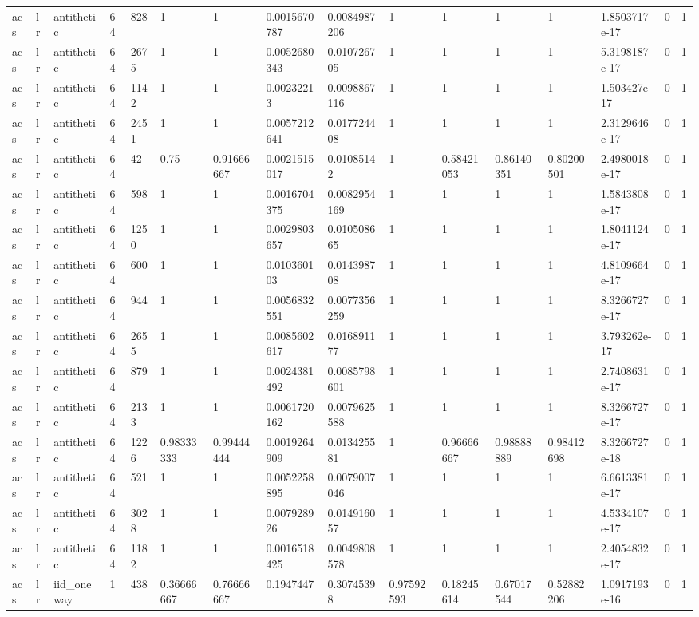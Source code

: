 \begin{tabular}{llllllllllllllll}
acs & lr & antithetic & 64 & 828 & 1 & 1 & 0.0015670787 & 0.0084987206 & 1 & 1 & 1 & 1 & 1.8503717e-17 & 0 & 1 \\
acs & lr & antithetic & 64 & 2675 & 1 & 1 & 0.0052680343 & 0.010726705 & 1 & 1 & 1 & 1 & 5.3198187e-17 & 0 & 1 \\
acs & lr & antithetic & 64 & 1142 & 1 & 1 & 0.00232213 & 0.0098867116 & 1 & 1 & 1 & 1 & 1.503427e-17 & 0 & 1 \\
acs & lr & antithetic & 64 & 2451 & 1 & 1 & 0.0057212641 & 0.017724408 & 1 & 1 & 1 & 1 & 2.3129646e-17 & 0 & 1 \\
acs & lr & antithetic & 64 & 42 & 0.75 & 0.91666667 & 0.0021515017 & 0.01085142 & 1 & 0.58421053 & 0.86140351 & 0.80200501 & 2.4980018e-17 & 0 & 1 \\
acs & lr & antithetic & 64 & 598 & 1 & 1 & 0.0016704375 & 0.0082954169 & 1 & 1 & 1 & 1 & 1.5843808e-17 & 0 & 1 \\
acs & lr & antithetic & 64 & 1250 & 1 & 1 & 0.0029803657 & 0.010508665 & 1 & 1 & 1 & 1 & 1.8041124e-17 & 0 & 1 \\
acs & lr & antithetic & 64 & 600 & 1 & 1 & 0.010360103 & 0.014398708 & 1 & 1 & 1 & 1 & 4.8109664e-17 & 0 & 1 \\
acs & lr & antithetic & 64 & 944 & 1 & 1 & 0.0056832551 & 0.0077356259 & 1 & 1 & 1 & 1 & 8.3266727e-17 & 0 & 1 \\
acs & lr & antithetic & 64 & 2655 & 1 & 1 & 0.0085602617 & 0.016891177 & 1 & 1 & 1 & 1 & 3.793262e-17 & 0 & 1 \\
acs & lr & antithetic & 64 & 879 & 1 & 1 & 0.0024381492 & 0.0085798601 & 1 & 1 & 1 & 1 & 2.7408631e-17 & 0 & 1 \\
acs & lr & antithetic & 64 & 2133 & 1 & 1 & 0.0061720162 & 0.0079625588 & 1 & 1 & 1 & 1 & 8.3266727e-17 & 0 & 1 \\
acs & lr & antithetic & 64 & 1226 & 0.98333333 & 0.99444444 & 0.0019264909 & 0.013425581 & 1 & 0.96666667 & 0.98888889 & 0.98412698 & 8.3266727e-18 & 0 & 1 \\
acs & lr & antithetic & 64 & 521 & 1 & 1 & 0.0052258895 & 0.0079007046 & 1 & 1 & 1 & 1 & 6.6613381e-17 & 0 & 1 \\
acs & lr & antithetic & 64 & 3028 & 1 & 1 & 0.007928926 & 0.014916057 & 1 & 1 & 1 & 1 & 4.5334107e-17 & 0 & 1 \\
acs & lr & antithetic & 64 & 1182 & 1 & 1 & 0.0016518425 & 0.0049808578 & 1 & 1 & 1 & 1 & 2.4054832e-17 & 0 & 1 \\
acs & lr & iid\_oneway & 1 & 438 & 0.36666667 & 0.76666667 & 0.1947447 & 0.30745398 & 0.97592593 & 0.18245614 & 0.67017544 & 0.52882206 & 1.0917193e-16 & 0 & 1 \\

\end{tabular}
